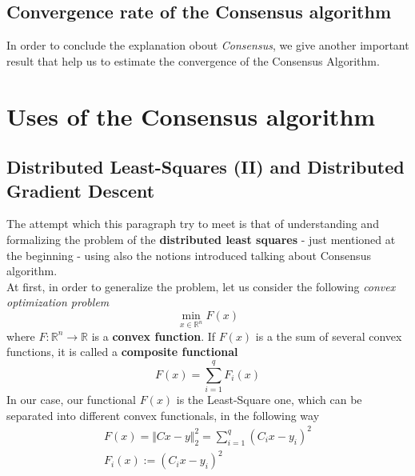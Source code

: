 \subsection{Convergence rate of the Consensus algorithm}
In order to conclude the explanation obout \textit{Consensus}, we give another important result that help us to estimate the convergence of the Consensus Algorithm.\\

\hspace*{-5mm}
%


\section{Uses of the Consensus algorithm}

\subsection{Distributed Least-Squares (II) and Distributed Gradient Descent}
The attempt which this paragraph try to meet is that of understanding and formalizing the problem of the \textbf{distributed least squares} - just mentioned at the beginning - using also the notions introduced talking about Consensus algorithm.\\

At first, in order to generalize the problem, let us consider the following \textit{convex optimization problem}
\begin{equation}
    \min_{x\in\mathbb{R}^n} F(x)
\end{equation}
where $F:\mathbb{R}^n\to\mathbb{R}$ is a \textbf{convex function}. If $F(x)$ is a the sum of several convex functions, it is called a \textbf{composite functional}
\begin{equation}
    F(x)=\sum_{i=1}^q {F_i(x)}
\end{equation}
In our case, our functional $F(x)$ is the Least-Square one, which can be separated into different convex functionals, in the following way
\begin{align}
    F(x)=\Vert Cx-y \Vert_2^2=\sum_{i=1}^q (C_ix-y_i)^2\\
    F_i(x):=(C_ix-y_i)^2
\end{align}

